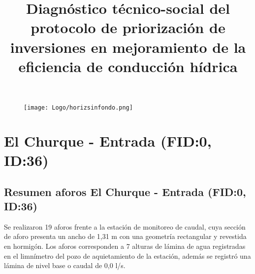 \documentclass[]{article}
\title{Diagnóstico técnico-social del protocolo de priorización de inversiones en mejoramiento de la eficiencia de conducción hídrica}
\author{}
\date{}
\begin{document}
\sloppy 

\begin{titlepage}

\begin{figure}
 \centering \vspace*{1.5in}
  \texttt{[image: Logo/horizsinfondo.png]}
  \vspace*{1in}
\end{figure}
\maketitle \thispagestyle{empty} \vspace*{3in}
\begin{center}
    \fontsize{14}{0} \selectfont{Marzo 2018}
\end{center}

\end{titlepage}

\section{El Churque - Entrada (FID:0, ID:36)}\label{ID:36}

\subsection{Resumen aforos El Churque - Entrada (FID:0, ID:36)}\label{aforos ID:36}

Se realizaron 19 aforos frente a la estación de monitoreo de caudal, cuya sección de aforo presenta un ancho de 1,31 m con una geometría rectangular y revestida en hormigón. Los aforos corresponden a 7 alturas de lámina de agua registradas en el limnímetro del pozo de aquietamiento de la estación, además se registró una lámina de nivel base o caudal de 0,0 l/s.
\end{document}
